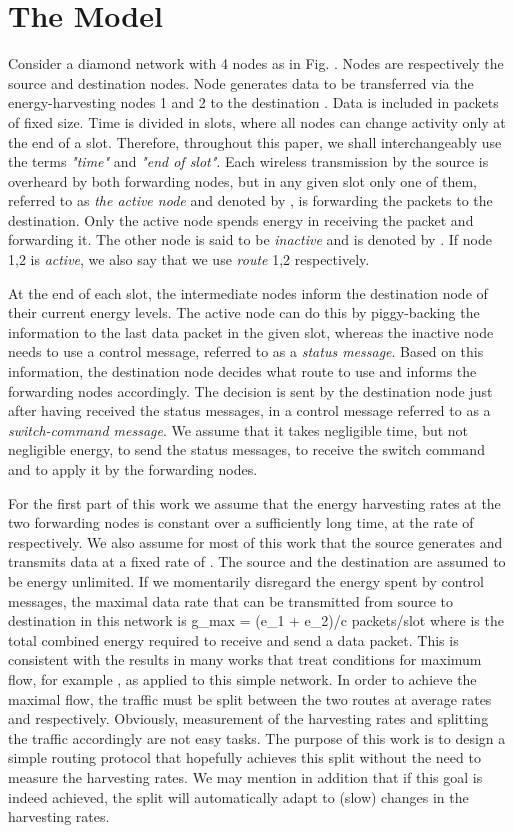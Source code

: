 \documentclass[12 pt]{article}
\newcommand{\debug}[1]{\mbox{\tt #1}}
\renewcommand{\debug}[1]{}              \newcommand{\cmd}[1]{}
\newcommand{\msec}[2]{\renewcommand{\sname}{}\section[#1
	\debug{\fbox {#2}}]{#1 \cmd{msec} \dlabelx{#2}}\markboth{\today}{Sec. \thesection}}
\begin{document}
\msec{The Model}{Model}

Consider a diamond network with 4 nodes as in Fig. .  Nodes  are respectively the source and destination nodes.  Node  generates data to be transferred via the energy-harvesting nodes 1 and 2 to the destination .
Data is included in packets of fixed size. Time is divided in slots, where all nodes can change activity only at the end of a slot. Therefore, throughout this paper, we shall interchangeably use the terms \emph{"time"} and \emph{"end of slot"}.  Each wireless transmission by the source is overheard by both forwarding nodes, but in any given slot only one of them, referred to as \emph{the active node} and denoted by , is forwarding the packets to the destination.  Only the active node spends energy in receiving the packet and forwarding it.  The other node is said to be \emph{inactive} and is denoted by .  If node 1,2 is \emph{active}, we also say that we use \emph{route} 1,2 respectively.

At the end of each slot, the intermediate nodes inform the destination node of their current energy levels.  The active node can do this by piggy-backing the information to the last data packet in the given slot, whereas the inactive node needs to use a control message, referred to as a \emph{status message}.  Based on this information, the destination node decides what route to use and informs the forwarding nodes accordingly.  The decision is sent by the destination node just after having received the status messages, in a control message referred to as a \emph{switch-command message}.  We assume that it takes negligible time, but not negligible energy, to send the status messages, to receive the switch command and to apply it by the forwarding nodes.

For the first part of this work we assume that the energy harvesting rates at the two forwarding nodes is constant over a sufficiently long time, at the rate of   respectively.  We also assume for most of this work that the source generates and transmits data at a fixed rate of .  The source and the destination are assumed to be energy unlimited.
If we momentarily disregard the energy spent by control messages, the maximal data rate that can be transmitted from source to destination in this network is
\SB
g_{max} = (e_1 + e_2)/c\text{   ;    } packets/slot
\SE
where  is the total combined energy required to receive and send a data packet.  This is consistent with the results in many works that treat conditions for maximum flow, for example , as applied to this simple network.  In order to achieve the maximal flow, the traffic must be split between the two routes at average rates  and  respectively.  Obviously, measurement of the harvesting rates and splitting the traffic accordingly are not easy tasks.  The purpose of this work is to design a simple routing protocol that hopefully achieves this split without the need to measure the harvesting rates.  We may mention in addition that if this goal is indeed achieved, the split will automatically adapt to (slow) changes in the harvesting rates.
\end{document}
